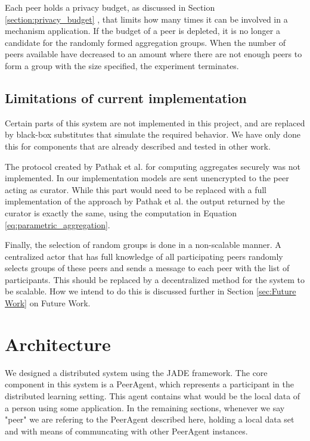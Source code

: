 Each peer holds a privacy budget, as discussed in Section \ref{section:privacy_budget} , that limits how many times it can be involved in a mechanism application. If the budget of a peer is depleted, it is no longer a candidate for the randomly formed aggregation groups. When the number of peers available have decreased to an amount where there are not enough peers to form a group with the size specified, the experiment terminates.

\subsection{Limitations of current implementation}

Certain parts of this system are not implemented in this project, and are replaced by black-box substitutes that simulate the required behavior. We have only done this for components that are already described and tested in other work. 

The protocol created by Pathak et al. for computing aggregates securely was not implemented. In our implementation models are sent unencrypted to the peer acting as curator. While this part would need to be replaced with a full implementation of the approach by Pathak et al. the output returned by the curator is exactly the same, using the computation in Equation \ref{eq:parametric_aggregation}. 

Finally, the selection of random groups is done in a non-scalable manner. A centralized actor that has full knowledge of all participating peers randomly selects groups of these peers and sends a message to each peer with the list of participants. This should be replaced by a decentralized method for the system to be scalable. How we intend to do this is discussed further in Section \ref{sec:Future Work} on Future Work.


\section{Architecture} \label{sec:architecture}

We designed a distributed system using the JADE framework. The core component in this system is a PeerAgent, which represents a participant in the distributed learning setting. This agent contains what would be the local data of a person using some application. In the remaining sections, whenever we say "peer" we are refering to the PeerAgent described here, holding a local data set and with means of communcating with other PeerAgent instances.

